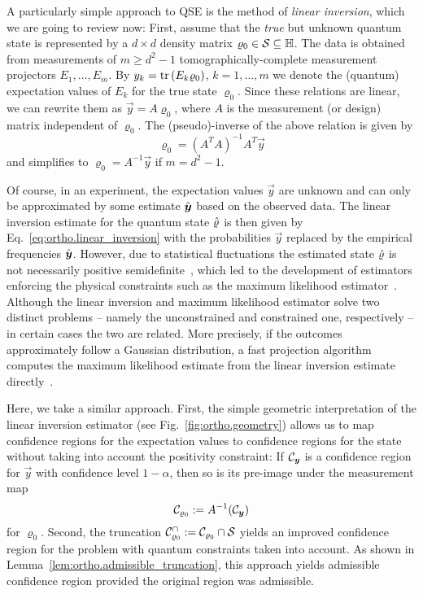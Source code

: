 A particularly simple approach to QSE is the method of \emph{linear inversion}, which we are going to review now:
First, assume that the \emph{true} but unknown quantum state is represented by a $d\times d$ density matrix $\varrho_0 \in \mathcal{S} \subseteq \mathbb{H}$.
The data is obtained from measurements of $m\geq d^{2} - 1$ tomographically-complete measurement projectors $E_{1},\ldots,E_{m}$.
By $y_{k}=\operatorname{tr}\left(E_{k}\varrho_0\right)$, $k=1,\ldots,m$ we denote the (quantum) expectation values of $E_{k}$ for the true state $\varrho_0$.
Since these relations are linear, we can rewrite them as $\vec{y} = A \varrho_0$, where $A$ is the measurement (or design) matrix independent of $\varrho_0$.
The (pseudo)-inverse of the above relation is given by
\[
  \label{eq:ortho.linear_inversion}
  \varrho_0 ={\left(A^{T}A\right)}^{-1}A^{T}\vec{y}
\]
and simplifies to $\varrho_0=A^{-1}\vec{y}$ if $m=d^{2} - 1$.

Of course, in an experiment, the expectation values $\vec{y}$ are unknown and can only be approximated by some estimate $\hat{{\boldsymbol{y}}}$ based on the observed data.
The linear inversion estimate for the quantum state $\hat{\varrho}$ is then given by Eq.~\eqref{eq:ortho.linear_inversion} with the probabilities $\vec y$ replaced by the empirical frequencies $\hat{{\boldsymbol{y}}}$.
However, due to statistical fluctuations the estimated state $\hat{\varrho}$ is not necessarily positive semidefinite~\cite{Knips_2015_How}, which led to the development of estimators enforcing the physical constraints such as the maximum likelihood estimator~\cite{Hradil_2004_3}.
Although the linear inversion and maximum likelihood estimator solve two distinct problems -- namely the unconstrained and constrained one, respectively -- in certain cases the two are related.
 More precisely, if the outcomes approximately follow a Gaussian distribution, a fast projection algorithm computes the maximum likelihood estimate from the linear inversion estimate directly~\cite{Smolin_2012_Maximum}.

Here, we take a similar approach.
First, the simple geometric interpretation of the linear inversion estimator (see Fig.~\ref{fig:ortho.geometry}) allows us to map confidence regions for the expectation values to confidence regions for the state without taking into account the positivity constraint:
If $\mathcal{C}_{\boldsymbol{y}}$ is a confidence region for $\vec y$ with confidence level $1 - \alpha$, then so is its pre-image under the measurement map
\[
  \label{eq:ortho.linear_confidence}
  \mathcal{C}_{\varrho_0} := A^{-1}(\mathcal{C}_{{\boldsymbol{y}}})
\]
for $\varrho_0$.
Second, the truncation $\mathcal{C}^\cap_{\varrho_0} := \mathcal{C}_{\varrho_0} \cap \mathcal{S}$ yields an improved confidence region for the problem with quantum constraints taken into account.
As shown in Lemma~\ref{lem:ortho.admissible_truncation}, this approach yields admissible confidence region provided the original region was admissible.


